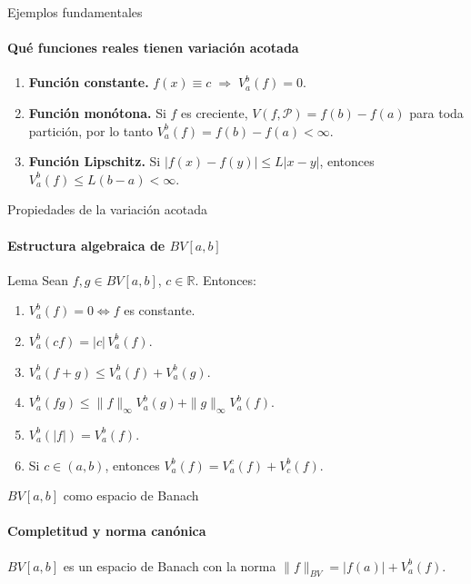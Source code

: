 \begin{frame}{Ejemplos fundamentales}
\framesubtitle{Qué funciones reales tienen variación acotada}

\begin{enumerate}
    \item \textbf{Función constante.}
    $f(x)\equiv c \;\Longrightarrow\; V_a^b(f)=0$.

    \item \textbf{Función monótona.}
    Si $f$ es creciente, $V(f,\mathcal{P})=f(b)-f(a)$ para toda partición,
    por lo tanto $V_a^b(f)=f(b)-f(a)<\infty$.

    \item \textbf{Función Lipschitz.}
    Si $|f(x)-f(y)|\le L|x-y|$, entonces $V_a^b(f)\le L(b-a)<\infty$.
\end{enumerate}


\end{frame}


\begin{frame}{Propiedades de la variación acotada}
\framesubtitle{Estructura algebraica de $BV[a,b]$}

\begin{block}{Lema}
Sean $f,g \in BV[a,b]$, $c\in\mathbb{R}$. Entonces:
\begin{enumerate}
    \item $V_a^b(f) = 0 \iff f$ es constante.
    \item $V_a^b(cf) = |c|\,V_a^b(f)$.
    \item $V_a^b(f+g) \le V_a^b(f) + V_a^b(g)$.
    \item $V_a^b(fg) \le \|f\|_{\infty} V_a^b(g) + \|g\|_{\infty} V_a^b(f)$.
    \item $V_a^b(|f|) = V_a^b(f)$.
    \item Si $c\in(a,b)$, entonces $V_a^b(f)=V_a^c(f)+V_c^b(f)$.
\end{enumerate}
\end{block}

\end{frame}


\begin{frame}{$BV[a,b]$ como espacio de Banach}
\framesubtitle{Completitud y norma canónica}

\begin{theorem}
$BV[a,b]$ es un espacio de Banach con la norma
$\|f\|_{BV}= |f(a)| + V_a^b(f)$.
\end{theorem}

\end{frame}

